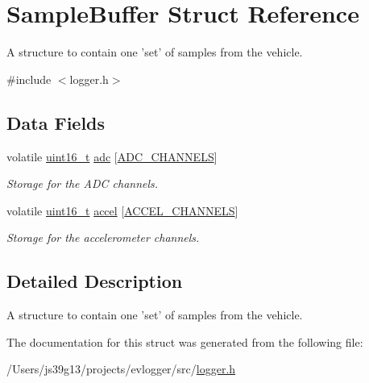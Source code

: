 \hypertarget{structSampleBuffer}{\section{Sample\-Buffer Struct Reference}
\label{structSampleBuffer}
}


A structure to contain one 'set' of samples from the vehicle.  




{\ttfamily \#include $<$logger.\-h$>$}

\subsection*{Data Fields}
\begin{DoxyCompactItemize}
\item 
volatile \hyperlink{typedefs_8h_a1f1825b69244eb3ad2c7165ddc99c956}{uint16\-\_\-t} \hyperlink{group__logger_gad08c877a8bf235f2cdaf78782f8ac5fe}{adc} \mbox{[}\hyperlink{group__logger_ga065dcfa648ca52ed6214008cb177de36}{A\-D\-C\-\_\-\-C\-H\-A\-N\-N\-E\-L\-S}\mbox{]}
\begin{DoxyCompactList}\small\item\em Storage for the A\-D\-C channels. \end{DoxyCompactList}\item 
volatile \hyperlink{typedefs_8h_a1f1825b69244eb3ad2c7165ddc99c956}{uint16\-\_\-t} \hyperlink{group__logger_ga9000597ffb24f87fb295587c7a443d9c}{accel} \mbox{[}\hyperlink{group__logger_ga97ed3fe57790c99c8e351a42713c604d}{A\-C\-C\-E\-L\-\_\-\-C\-H\-A\-N\-N\-E\-L\-S}\mbox{]}
\begin{DoxyCompactList}\small\item\em Storage for the accelerometer channels. \end{DoxyCompactList}\end{DoxyCompactItemize}


\subsection{Detailed Description}
A structure to contain one 'set' of samples from the vehicle. 

The documentation for this struct was generated from the following file\-:\begin{DoxyCompactItemize}
\item 
/\-Users/js39g13/projects/evlogger/src/\hyperlink{logger_8h}{logger.\-h}\end{DoxyCompactItemize}
